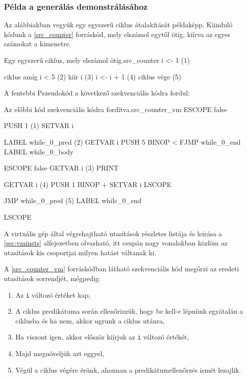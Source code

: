 \subsubsection{Példa a generálás demonstrálásához}

Az alábbiakban vegyük egy egyszerű ciklus átalakítását példaképp. Kiinduló kódunk a \ref{src_counter} forráskód, mely elszámol egytől ötig, kiírva az egyes számokat a kimenetre.

\begin{code}{Egy egyszerű ciklus, mely elszámol ötig.}{src_counter}
i <- 1 (1)

ciklus amíg i < 5 (2)
  kiír i (3)
  i <- i + 1 (4)
ciklus vége (5)
\end{code}

A fentebbi Pszeudokód a következő szekvenciális kódra fordul:

\begin{code}{Az előbbi kód szekvenciális kódra fordítva.}{src_counter_vm}
ESCOPE false

 PUSH   1 (1)
 SETVAR i

 LABEL  while_0_pred (2)
 GETVAR i
 PUSH   5
 BINOP  <
 FJMP   while_0_end
 LABEL  while_0_body

 ESCOPE false
  GETVAR i (3)
  PRINT

  GETVAR i (4)
  PUSH   1
  BINOP  +
  SETVAR i
 LSCOPE

 JMP   while_0_pred (5)
 LABEL while_0_end

LSCOPE
\end{code}

A virtuális gép által végrehajtható utasítások részletes listája és leírása a \ref{sec:vminsts} alfejezetben olvasható, itt csupán nagy vonalakban közlöm az utasítások kis csoportjai milyen hatást váltanak ki.

A \ref{src_counter_vm} forráskódban látható szekvenciális kód megőrzi az eredeti utasítások sorrendjét, mégpedig:

\begin{enumerate}
    \item Az \texttt{i} változó értéket kap,
    \item A ciklus predikátuma során ellenőrizzük, hogy be kell-e lépnünk egyátalán a ciklusba és ha nem, akkor ugrunk a ciklus utánra,
    \item Ha viszont igen, akkor először kiírjuk az \texttt{i} változó értékét,
    \item Majd megnöveljük azt eggyel,
    \item Végül a ciklus végére érünk, ahonnan a predikátumellenőrzés ismét lezajlik.
\end{enumerate}

